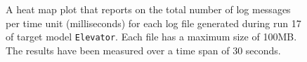 \begin{figure}[htbp]
\centering
\begin{minipage}{1\textwidth}
  \centering
\end{minipage}
\caption{A heat map plot that reports on the total number of log messages per time unit (milliseconds) for each log file generated during run 17 of target model \texttt{Elevator}. Each file has a maximum size of 100MB. The results have been measured over a time span of 30 seconds.}
\label{figure:throughput_sum_elevator_17}
\end{figure}